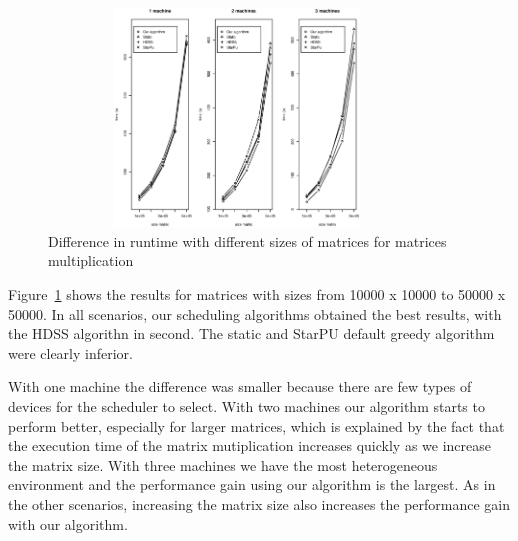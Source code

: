 \documentclass[journal]{IEEEtran}
\begin{document}
\begin{figure}[htb]
	\begin{center}
	\centering
			\includegraphics[width=10cm,height=5.8cm]{MaquinasMatrix.eps}
	\caption{Difference in runtime with different sizes of matrices for matrices multiplication}
	\label{fig:todosJuntos}
	\end{center}
\end{figure}



Figure~\ref{fig:todosJuntos} shows the results for matrices with sizes from
10000 x 10000 to 50000 x 50000. In all scenarios, our scheduling algorithms
obtained the best results, with the HDSS algorithn in second. The static and
StarPU default greedy algorithm were clearly inferior.

With one machine the difference was smaller because there are few types of
devices for the scheduler to select. With two machines our algorithm starts to
perform better, especially for larger matrices, which is explained by the fact
that the execution time of the matrix mutiplication increases quickly as we
increase the matrix size. With three machines we have the most heterogeneous
environment and the performance gain using our algorithm is the largest. As in
the other scenarios, increasing the matrix size also increases the performance
gain with our algorithm.


%
\end{document}
